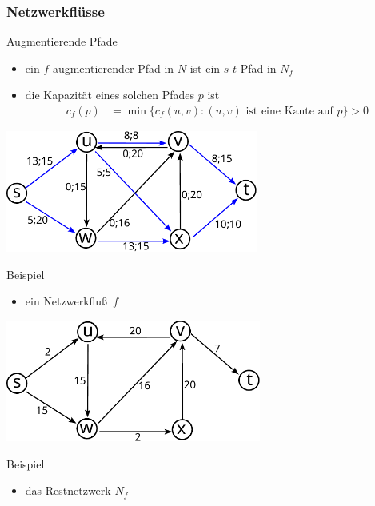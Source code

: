 \documentclass[aspectratio=1610, 11pt]{beamer}
\newcommand{\mytitle}{Netzwerkfl\"usse}
\begin{document}
\begin{frame}\frametitle{\mytitle}
	\begin{overprint}
		\begin{exampleblock}{Augmentierende Pfade}
			\begin{itemize}
				\item ein \alert{$f$-augmentierender Pfad} in $N$ ist ein $s$-$t$-Pfad in $N_f$
				\item die \alert{Kapazit\"at} eines solchen Pfades $p$ ist
					\begin{align*}
						c_f(p)&=\min\{c_f(u,v):(u,v)\mbox{ ist eine Kante auf }p\}>0
					\end{align*}
			\end{itemize}
		\end{exampleblock}
		\begin{center} \includegraphics[height=40mm]{./images/flow1.pdf} \end{center}
		\begin{exampleblock}{Beispiel}
			\begin{itemize}
				\item ein Netzwerkflu\ss\ $f$
			\end{itemize}
		\end{exampleblock}
		\begin{center} \includegraphics[height=40mm]{./images/flow2.pdf} \end{center}
		\begin{exampleblock}{Beispiel}
			\begin{itemize}
				\item das Restnetzwerk $N_f$
			\end{itemize}

\end{exampleblock}
\end{overprint}
\end{frame}
\end{document}
